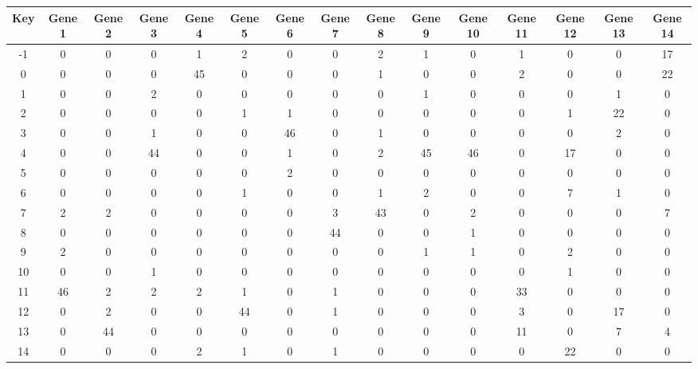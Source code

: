 \begin{tabular}{|c|c|c|c|c|c|c|c|c|c|c|c|c|c|c|}
\hline
Key & Gene 1 & Gene 2 & Gene 3 & Gene 4 & Gene 5 & Gene 6 & Gene 7 & Gene 8 & Gene 9 & Gene 10 & Gene 11 & Gene 12 & Gene 13 & Gene 14 \\
\hline
-1 & 0 & 0 & 0 & 1 & 2 & 0 & 0 & 2 & 1 & 0 & 1 & 0 & 0 & 17 \\
0 & 0 & 0 & 0 & 45 & 0 & 0 & 0 & 1 & 0 & 0 & 2 & 0 & 0 & 22 \\
1 & 0 & 0 & 2 & 0 & 0 & 0 & 0 & 0 & 1 & 0 & 0 & 0 & 1 & 0 \\
2 & 0 & 0 & 0 & 0 & 1 & 1 & 0 & 0 & 0 & 0 & 0 & 1 & 22 & 0 \\
3 & 0 & 0 & 1 & 0 & 0 & 46 & 0 & 1 & 0 & 0 & 0 & 0 & 2 & 0 \\
4 & 0 & 0 & 44 & 0 & 0 & 1 & 0 & 2 & 45 & 46 & 0 & 17 & 0 & 0 \\
5 & 0 & 0 & 0 & 0 & 0 & 2 & 0 & 0 & 0 & 0 & 0 & 0 & 0 & 0 \\
6 & 0 & 0 & 0 & 0 & 1 & 0 & 0 & 1 & 2 & 0 & 0 & 7 & 1 & 0 \\
7 & 2 & 2 & 0 & 0 & 0 & 0 & 3 & 43 & 0 & 2 & 0 & 0 & 0 & 7 \\
8 & 0 & 0 & 0 & 0 & 0 & 0 & 44 & 0 & 0 & 1 & 0 & 0 & 0 & 0 \\
9 & 2 & 0 & 0 & 0 & 0 & 0 & 0 & 0 & 1 & 1 & 0 & 2 & 0 & 0 \\
10 & 0 & 0 & 1 & 0 & 0 & 0 & 0 & 0 & 0 & 0 & 0 & 1 & 0 & 0 \\
11 & 46 & 2 & 2 & 2 & 1 & 0 & 1 & 0 & 0 & 0 & 33 & 0 & 0 & 0 \\
12 & 0 & 2 & 0 & 0 & 44 & 0 & 1 & 0 & 0 & 0 & 3 & 0 & 17 & 0 \\
13 & 0 & 44 & 0 & 0 & 0 & 0 & 0 & 0 & 0 & 0 & 11 & 0 & 7 & 4 \\
14 & 0 & 0 & 0 & 2 & 1 & 0 & 1 & 0 & 0 & 0 & 0 & 22 & 0 & 0 \\
\hline
\end{tabular}
